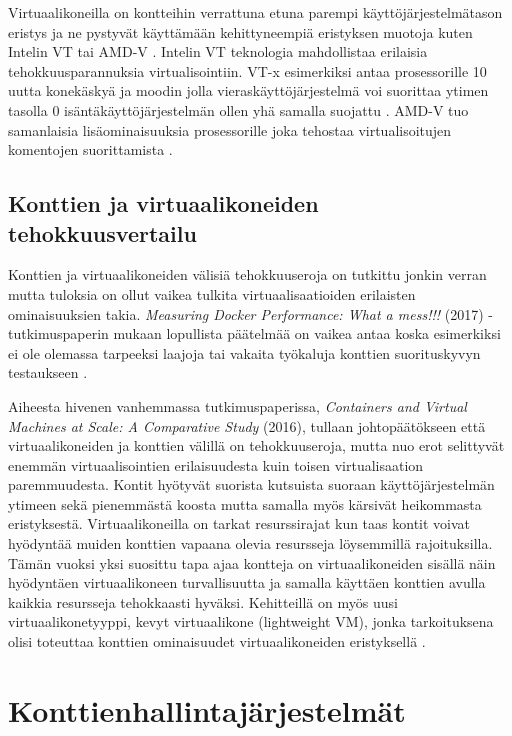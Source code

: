 \documentclass[finnish]{tktltiki2}
\theoremstyle{definition}
\theoremstyle{remark}
\begin{document}
Virtuaalikoneilla on kontteihin verrattuna etuna parempi käyttöjärjestelmätason eristys ja ne pystyvät käyttämään kehittyneempiä eristyksen muotoja kuten Intelin VT tai AMD-V \cite{openvz-xen-kvm}. Intelin VT teknologia mahdollistaa erilaisia tehokkuusparannuksia virtualisointiin. VT-x esimerkiksi antaa prosessorille 10 uutta konekäskyä \cite{vt-x-overview} ja moodin jolla vieraskäyttöjärjestelmä voi suorittaa ytimen tasolla 0 isäntäkäyttöjärjestelmän ollen yhä samalla suojattu \cite{vt-x-analysis}. AMD-V tuo samanlaisia lisäominaisuuksia prosessorille joka tehostaa virtualisoitujen komentojen suorittamista \cite{amd-v-snippet}.

\subsection{Konttien ja virtuaalikoneiden tehokkuusvertailu}

Konttien ja virtuaalikoneiden välisiä tehokkuuseroja on tutkittu jonkin verran mutta tuloksia on ollut vaikea tulkita virtuaalisaatioiden erilaisten ominaisuuksien takia. \textit{Measuring Docker Performance: What a mess!!!} (2017) -tutkimuspaperin mukaan lopullista päätelmää on vaikea antaa koska esimerkiksi ei ole olemassa tarpeeksi laajoja tai vakaita työkaluja konttien suorituskyvyn testaukseen \cite{docker-mess}. 

Aiheesta hivenen vanhemmassa tutkimuspaperissa, \textit{Containers and Virtual Machines at Scale: A Comparative Study} (2016), tullaan johtopäätökseen että virtuaalikoneiden ja konttien välillä on tehokkuuseroja, mutta nuo erot selittyvät enemmän virtuaalisointien erilaisuudesta kuin toisen virtualisaation paremmuudesta. Kontit hyötyvät suorista kutsuista suoraan käyttöjärjestelmän ytimeen sekä pienemmästä koosta mutta samalla myös kärsivät heikommasta eristyksestä. Virtuaalikoneilla on tarkat resurssirajat kun taas kontit voivat hyödyntää muiden konttien vapaana olevia resursseja löysemmillä rajoituksilla. Tämän vuoksi yksi suosittu tapa ajaa kontteja on virtuaalikoneiden sisällä näin hyödyntäen virtuaalikoneen turvallisuutta ja samalla käyttäen konttien avulla kaikkia resursseja tehokkaasti hyväksi. Kehitteillä on myös uusi virtuaalikonetyyppi, kevyt virtuaalikone (lightweight VM),  jonka tarkoituksena olisi toteuttaa konttien ominaisuudet virtuaalikoneiden eristyksellä \cite{containers-vms-study}.

\section{Konttienhallintajärjestelmät}
\end{document}
